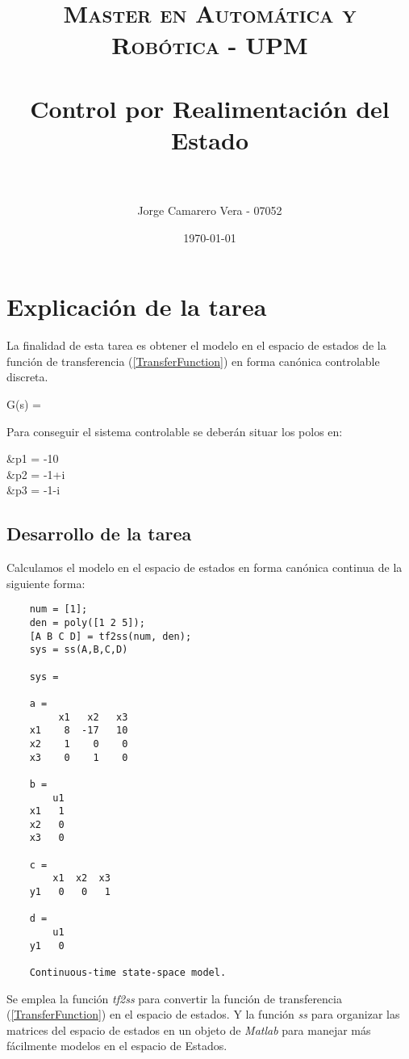 \documentclass[a4paper, fontsize=11pt]{scrartcl} %
\title{	
	\normalfont \normalsize 
	\textsc{Master en Automática y Robótica - UPM} \\ [25pt] %
	\horrule{0.5pt} \\[0.4cm] %
	\huge Control por Realimentación del Estado \\ %
	\horrule{2pt} \\[0.5cm] %
}
\author{Jorge Camarero Vera - 07052} %
\date{\normalsize\today} %
\numberwithin{equation}{section} %
\numberwithin{figure}{section} %
\numberwithin{table}{section} %
\newenvironment{myalign}{\par\nobreak\large\noindent\align}{\endalign} %
\begin{document}
	\maketitle
	
	\section{Explicación de la tarea}
	
	La finalidad de esta tarea es obtener el modelo en el espacio de estados de la función de transferencia (\ref{TransferFunction}) en forma canónica  controlable discreta.
	
	\begin{myalign}
		G(s) = 
		\label{TransferFunction}
	\end{myalign}
	
	Para conseguir el sistema controlable se deberán situar los polos en:
	
	\begin{myalign}
		\begin{split}
			&p1 = -10\\
			&p2 = -1+i\\
			&p3 = -1-i\\
		\end{split}
	\label{Poles}
	\end{myalign}
	
	\subsection{Desarrollo de la tarea}
	
	Calculamos el modelo en el espacio de estados en forma canónica continua de la siguiente forma:
	
	\begin{lstlisting}
	num = [1];
	den = poly([1 2 5]);
	[A B C D] = tf2ss(num, den);
	sys = ss(A,B,C,D)
	
	sys =
	
	a = 
	     x1   x2   x3
	x1    8  -17   10
	x2    1    0    0
	x3    0    1    0
	
	b = 
	    u1
	x1   1
	x2   0
	x3   0
	
	c = 
	    x1  x2  x3
	y1   0   0   1
	
	d = 
	    u1
	y1   0
	
	Continuous-time state-space model.
	\end{lstlisting}
	
	Se emplea la función \textit{tf2ss} para convertir la función de transferencia (\ref{TransferFunction}) en el espacio de estados. Y la función \textit{ss} para organizar las matrices del espacio de estados en un objeto de \textit{Matlab} para manejar más fácilmente modelos en el espacio de Estados.\\
	
\end{document}
